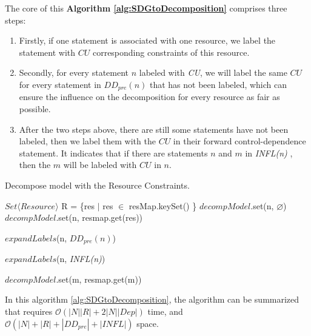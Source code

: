 The core of this \textbf{Algorithm \ref{alg:SDGtoDecomposition}} comprises three steps:
\begin{enumerate}
\item Firstly, if one statement is associated with one resource, we label the statement with $CU$ corresponding constraints of this resource.
\item Secondly, for every statement $n$ labeled with \emph{CU}, we will label the same $CU$ for every statement in $DD_{pre}(n)$ that has not been labeled, which can ensure the influence on the decomposition for every resource as fair as possible.
\item After the two steps above, there are still some statements have not been labeled, then we label them with the $CU$ in their forward control-dependence statement. It indicates that if there are statements $n$ and $m$ in \emph{INFL(n)} , then the $m$ will be labeled with $CU$ in $n$.
\end{enumerate}


\begin{algorithm}[!htb]
\small
\label{alg:SDGtoDecomposition}
    \caption{Decompose model with the Resource Constraints.}
    \BlankLine
    \BlankLine
    \BlankLine

    $Set\langle Resource \rangle$ R = \{res $|$ res $\in$ resMap.keySet() \}\;
    {
       $decompModel$.set(n, $\varnothing$)\;
       {
            {
                $decompModel$.set(n, resmap.get(res))\;
            }
       }
    }

    {
        $expandLabels$(n, $DD_{pre}(n)$)\;
    }

    {
        $expandLabels$(n, \emph{INFL(n)})\;
    }

    {
        {
            {
                $decompModel$.set(m, resmap.get(m))\;
            }
        }
    }
\end{algorithm}




In this algorithm \ref{alg:SDGtoDecomposition}, the algorithm can be summarized that requires $\mathcal{O}(|N||R|+2|N||Dep|)$ time, and $\mathcal{O}(|N|+|R|+|DD_{pre}|+|INFL|)$ space.


